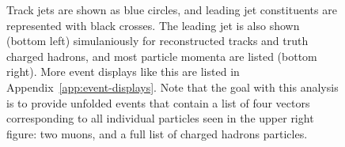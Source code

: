 \begin{figure}[h!]
{    %
    Track jets are shown as blue circles, and leading jet constituents are represented with black crosses.
    The leading jet is also shown (bottom left) simulaniously for reconstructed tracks and truth charged hadrons, and most particle momenta are listed (bottom right).
    More event displays like this are listed in Appendix~\ref{app:event-displays}. 
    Note that the goal with this analysis is to provide unfolded events that contain a list of four vectors corresponding to all individual particles seen in the upper right figure: two muons, and a full list of charged hadrons particles.}
  \label{fig:EventDisplay}
\end{figure}

\clearpage

